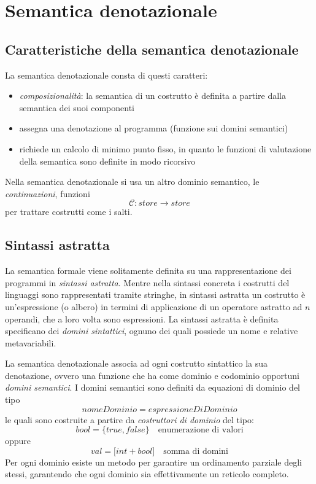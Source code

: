 \documentclass{article}[10pt]
\begin{document}
	\section{Semantica denotazionale}
	\subsection{Caratteristiche della semantica denotazionale}
	La semantica denotazionale consta di questi caratteri:
	\begin{itemize}
		\item \textit{composizionalità}: la semantica di un costrutto è definita a partire dalla semantica dei suoi componenti
		\item assegna una denotazione al programma (funzione sui domini semantici)
		\item richiede un calcolo di minimo punto fisso, in quanto le funzioni di valutazione della semantica sono definite in modo ricorsivo
	\end{itemize}

	Nella semantica denotazionale si usa un altro dominio semantico, le \textit{continuazioni}, funzioni $$\mathcal{C}:store \to store$$ per trattare costrutti come i salti.
	\subsection{Sintassi astratta}
	La semantica formale viene solitamente definita su una rappresentazione dei programmi in \textit{sintassi astratta}.
	Mentre nella sintassi concreta i costrutti del linguaggi sono rappresentati tramite stringhe, in sintassi astratta un costrutto è un'espressione (o albero) in termini di applicazione di un operatore astratto ad $n$ operandi, che a loro volta sono espressioni.
	La sintassi astratta è definita specificano dei \textit{domini sintattici}, ognuno dei quali possiede un nome e relative metavariabili.
	
	La semantica denotazionale associa ad ogni costrutto sintattico la sua denotazione, ovvero una funzione che ha come dominio e codominio opportuni \textit{domini semantici}.
	I domini semantici sono definiti da equazioni di dominio del tipo $$nomeDominio = espressioneDiDominio$$ le quali sono costruite a partire da \textit{costruttori di dominio} del tipo:$$ bool = \lbrace true, false \rbrace \quad \text{enumerazione di valori}$$ oppure $$val = \lbrack int + bool \rbrack \quad \text{somma di domini}$$
	Per ogni dominio esiste un metodo per garantire un ordinamento parziale degli stessi, garantendo che ogni dominio sia effettivamente un reticolo completo.
	
\end{document}
